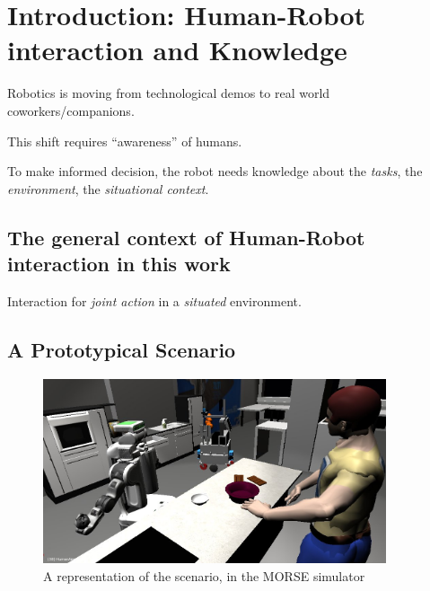 \chapter{Introduction: Human-Robot interaction and Knowledge}
\label{chapter|introduction}

Robotics is moving from technological demos to real world coworkers/companions.

This shift requires ``awareness'' of humans.

To make informed decision, the robot needs knowledge about the \emph{tasks},
the \emph{environment}, the \emph{situational context}.


\section{The general context of Human-Robot interaction in this work}
\label{sect|general-context}

Interaction for \emph{joint action} in a \emph{situated} environment.


\section{A Prototypical Scenario}
\label{sect|scenario}

\begin{figure}
	\centering
	\includegraphics[width=0.9\textwidth]{images/introduction/brownie_scenario.jpg}
	\caption{A representation of the scenario, in the MORSE simulator}
	\label{fig|scenario}
\end{figure}

